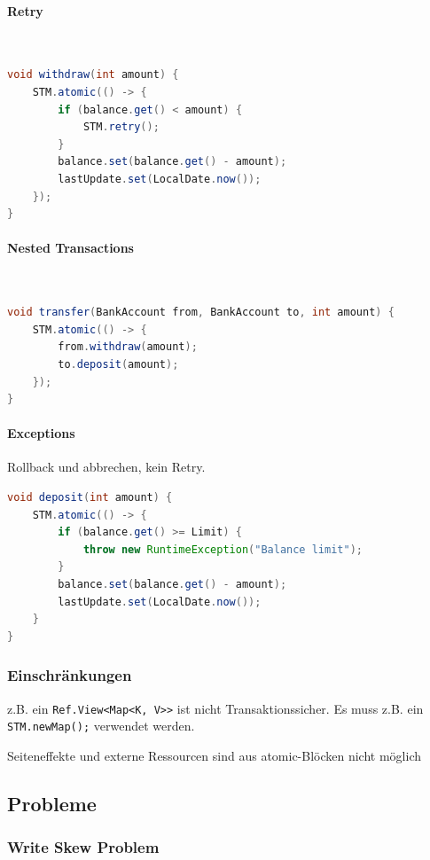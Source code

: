\paragraph{Retry} \hfill \\
\begin{lstlisting}[language=Java]
void withdraw(int amount) {
	STM.atomic(() -> {
		if (balance.get() < amount) {
			STM.retry();
		}
		balance.set(balance.get() - amount);
		lastUpdate.set(LocalDate.now());
	});
}
\end{lstlisting}


\paragraph{Nested Transactions} \hfill \\
\begin{lstlisting}[language=Java]
void transfer(BankAccount from, BankAccount to, int amount) {
	STM.atomic(() -> {
		from.withdraw(amount);
		to.deposit(amount);
	});
}
\end{lstlisting}


\paragraph{Exceptions} Rollback und abbrechen, kein Retry. \hfill \\
\begin{lstlisting}[language=Java]
void deposit(int amount) {
	STM.atomic(() -> {
		if (balance.get() >= Limit) {
			throw new RuntimeException("Balance limit");
		}
		balance.set(balance.get() - amount);
		lastUpdate.set(LocalDate.now());
	}
}
\end{lstlisting}

\subsubsection{Einschränkungen}

z.B. ein \lstinline|Ref.View<Map<K, V>>| ist nicht Transaktionssicher. Es muss z.B. ein \lstinline|STM.newMap();| verwendet werden.

Seiteneffekte und externe Ressourcen sind aus atomic-Blöcken nicht möglich

\subsection{Probleme}

\subsubsection{Write Skew Problem}

